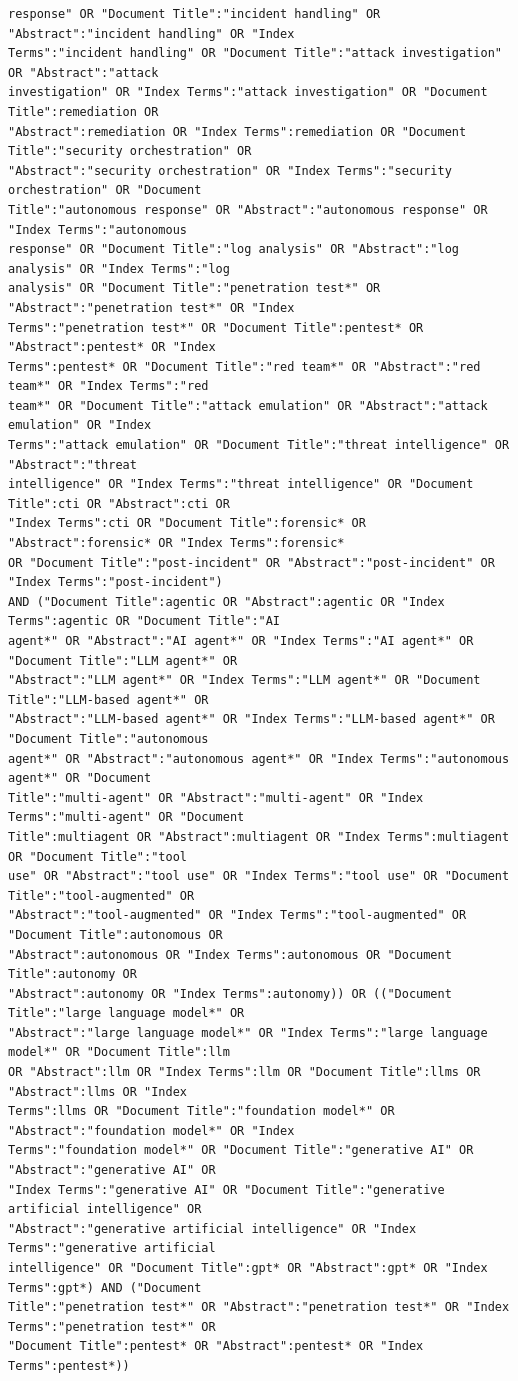 \begin{lstlisting}
response" OR "Document Title":"incident handling" OR "Abstract":"incident handling" OR "Index
Terms":"incident handling" OR "Document Title":"attack investigation" OR "Abstract":"attack
investigation" OR "Index Terms":"attack investigation" OR "Document Title":remediation OR
"Abstract":remediation OR "Index Terms":remediation OR "Document Title":"security orchestration" OR
"Abstract":"security orchestration" OR "Index Terms":"security orchestration" OR "Document
Title":"autonomous response" OR "Abstract":"autonomous response" OR "Index Terms":"autonomous
response" OR "Document Title":"log analysis" OR "Abstract":"log analysis" OR "Index Terms":"log
analysis" OR "Document Title":"penetration test*" OR "Abstract":"penetration test*" OR "Index
Terms":"penetration test*" OR "Document Title":pentest* OR "Abstract":pentest* OR "Index
Terms":pentest* OR "Document Title":"red team*" OR "Abstract":"red team*" OR "Index Terms":"red
team*" OR "Document Title":"attack emulation" OR "Abstract":"attack emulation" OR "Index
Terms":"attack emulation" OR "Document Title":"threat intelligence" OR "Abstract":"threat
intelligence" OR "Index Terms":"threat intelligence" OR "Document Title":cti OR "Abstract":cti OR
"Index Terms":cti OR "Document Title":forensic* OR "Abstract":forensic* OR "Index Terms":forensic*
OR "Document Title":"post-incident" OR "Abstract":"post-incident" OR "Index Terms":"post-incident")
AND ("Document Title":agentic OR "Abstract":agentic OR "Index Terms":agentic OR "Document Title":"AI
agent*" OR "Abstract":"AI agent*" OR "Index Terms":"AI agent*" OR "Document Title":"LLM agent*" OR
"Abstract":"LLM agent*" OR "Index Terms":"LLM agent*" OR "Document Title":"LLM-based agent*" OR
"Abstract":"LLM-based agent*" OR "Index Terms":"LLM-based agent*" OR "Document Title":"autonomous
agent*" OR "Abstract":"autonomous agent*" OR "Index Terms":"autonomous agent*" OR "Document
Title":"multi-agent" OR "Abstract":"multi-agent" OR "Index Terms":"multi-agent" OR "Document
Title":multiagent OR "Abstract":multiagent OR "Index Terms":multiagent OR "Document Title":"tool
use" OR "Abstract":"tool use" OR "Index Terms":"tool use" OR "Document Title":"tool-augmented" OR
"Abstract":"tool-augmented" OR "Index Terms":"tool-augmented" OR "Document Title":autonomous OR
"Abstract":autonomous OR "Index Terms":autonomous OR "Document Title":autonomy OR
"Abstract":autonomy OR "Index Terms":autonomy)) OR (("Document Title":"large language model*" OR
"Abstract":"large language model*" OR "Index Terms":"large language model*" OR "Document Title":llm
OR "Abstract":llm OR "Index Terms":llm OR "Document Title":llms OR "Abstract":llms OR "Index
Terms":llms OR "Document Title":"foundation model*" OR "Abstract":"foundation model*" OR "Index
Terms":"foundation model*" OR "Document Title":"generative AI" OR "Abstract":"generative AI" OR
"Index Terms":"generative AI" OR "Document Title":"generative artificial intelligence" OR
"Abstract":"generative artificial intelligence" OR "Index Terms":"generative artificial
intelligence" OR "Document Title":gpt* OR "Abstract":gpt* OR "Index Terms":gpt*) AND ("Document
Title":"penetration test*" OR "Abstract":"penetration test*" OR "Index Terms":"penetration test*" OR
"Document Title":pentest* OR "Abstract":pentest* OR "Index Terms":pentest*))
\end{lstlisting}
